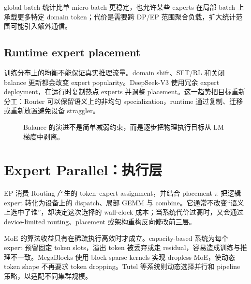 \documentclass[10pt,a4paper,fontset=none]{ctexart}
\begin{document}
global-batch 统计比单 micro-batch 更稳定，也允许某些 experts 在局部 batch 上承载更多特定 domain token；代价是需要跨 DP/EP 范围聚合负载，扩大统计范围可能引入额外通信。

\subsection{Runtime expert placement}

训练分布上的均衡不能保证真实推理流量。domain shift、SFT/RL 和关闭 balance 更新都会改变 expert popularity。DeepSeek-V3 使用冗余 expert deployment，在运行时复制热点 experts 并调整 placement\cite{deepseekv3}。这一趋势把目标重新分工：Router 可以保留语义上的非均匀 specialization，runtime 通过复制、迁移或重新放置避免设备 straggler。

\begin{figure}[htbp]
\centering
{}
\caption{Balance 的演进不是简单减弱约束，而是逐步把物理执行目标从 LM 梯度中剥离。}
\label{fig:balance}
\end{figure}

\section{Expert Parallel：执行层}

EP 消费 Routing 产生的 token--expert assignment，并结合 placement $\pi$ 把逻辑 expert 转化为设备上的 dispatch、局部 GEMM 与 combine。它通常不改变“语义上选中了谁”，却决定这次选择的 wall-clock 成本；当系统代价过高时，又会通过 device-limited routing、placement 或架构重构反向修改前三层。

MoE 的算法收益只有在稀疏执行高效时才成立。capacity-based 系统为每个 expert 预留固定 token slots，溢出 token 被丢弃或走 residual，容易造成训练与推理不一致。MegaBlocks 使用 block-sparse kernels 实现 dropless MoE，使动态 token shape 不再要求 token dropping\cite{gale2022megablocks}。Tutel 等系统则动态选择并行和 pipeline 策略，以适配不同集群规模\cite{hwang2022tutel}。
\end{document}
